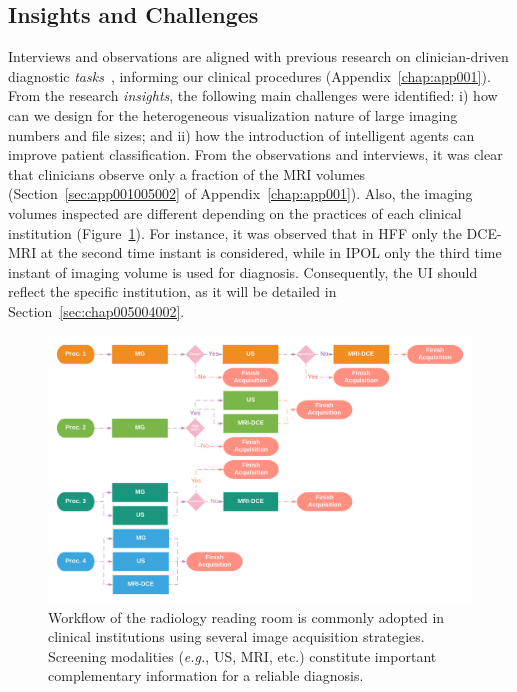 \subsection{Insights and Challenges}
\label{sec:chap005003002}

Interviews and observations are aligned with previous research on clinician-driven diagnostic {\it tasks}~\cite{Sultanum:2018:MTP:3173574.3173996}, informing our clinical procedures (Appendix~\ref{chap:app001}).
From the research {\it insights}, the following main challenges were identified:
i) how can we design for the heterogeneous visualization nature of large imaging numbers and file sizes; and
ii) how the introduction of intelligent agents can improve patient classification.
From the  observations and interviews, it was clear that clinicians observe only a fraction of the \ac{MRI} volumes (Section~\ref{sec:app001005002} of Appendix~\ref{chap:app001}).
Also, the imaging volumes inspected are different depending on the practices of each clinical institution \textcolor{revised}{(Figure~\ref{fig:fig018})}.
For instance, it was observed that in \acs{HFF} only the \acs{DCE-MRI} at the second time instant is considered, while in \acs{IPOL} only the third time instant of imaging volume is used for diagnosis.
Consequently, the \ac{UI} should reflect the specific institution, as it will be detailed in Section~\ref{sec:chap005004002}.

\begin{figure}[ht]
\centering
\includegraphics[width=\columnwidth]{images/fig018}
\caption{Workflow of the radiology reading room is commonly adopted in clinical institutions using several image acquisition strategies. Screening modalities ({\it e.g.}, US, MRI, etc.) constitute important complementary information for a reliable diagnosis.}
\label{fig:fig018}
\end{figure}

